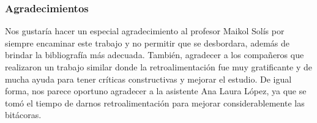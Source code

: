 \subsubsection{Agradecimientos}

Nos gustaría hacer un especial agradecimiento al profesor Maikol Solís por siempre encaminar este trabajo y no permitir que se desbordara, además de brindar la bibliografía más adecuada. También, agradecer a los compañeros que realizaron un trabajo similar donde la retroalimentación fue muy gratificante y de mucha ayuda para tener críticas constructivas y mejorar el estudio. De igual forma, nos parece oportuno agradecer a la asistente Ana Laura López, ya que se tomó el tiempo de darnos retroalimentación para mejorar considerablemente las bitácoras.

\nocite{*}



